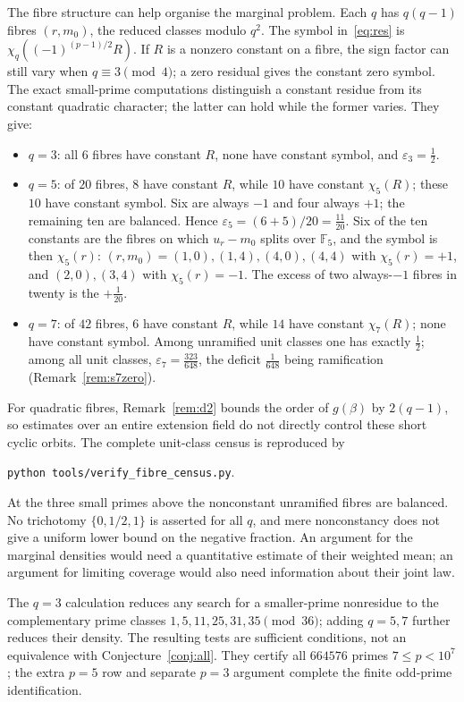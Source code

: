\documentclass[11pt,a4paper]{amsart}
\newcommand{\F}{\mathbb{F}}
\theoremstyle{plain}
\theoremstyle{definition}
\begin{document}
The fibre structure can help organise the marginal problem. Each \(q\) has \(q(q-1)\) fibres \((r,m_0)\), the reduced classes modulo \(q^2\). The symbol in~\eqref{eq:res} is \(\chi_q((-1)^{(p-1)/2}R)\). If \(R\) is a nonzero constant on a fibre, the sign factor can still vary when \(q\equiv3\pmod4\); a zero residual gives the constant zero symbol. The exact small-prime computations distinguish a constant residue from its constant quadratic character; the latter can hold while the former varies. They give:
\begin{itemize}
\item \(q=3\): all \(6\) fibres have constant \(R\), none have constant symbol, and \(\varepsilon_3=\tfrac12\).
\item \(q=5\): of \(20\) fibres, \(8\) have constant \(R\), while \(10\) have constant \(\chi_5(R)\); these \(10\) have constant symbol. Six are always \(-1\) and four always \(+1\); the remaining ten are balanced. Hence \(\varepsilon_5=(6+5)/20=\tfrac{11}{20}\). Six of the ten constants are the fibres on which \(u_r-m_0\) splits over \(\F_5\), and the symbol is then \(\chi_5(r)\): \((r,m_0)=(1,0),(1,4),(4,0),(4,4)\) with \(\chi_5(r)=+1\), and \((2,0),(3,4)\) with \(\chi_5(r)=-1\). The excess of two always-\(-1\) fibres in twenty is the \(+\tfrac1{20}\).
\item \(q=7\): of \(42\) fibres, \(6\) have constant \(R\), while \(14\) have constant \(\chi_7(R)\); none have constant symbol. Among unramified unit classes one has exactly \(\tfrac12\); among all unit classes, \(\varepsilon_7=\tfrac{323}{648}\), the deficit \(\tfrac1{648}\) being ramification (Remark~\ref{rem:s7zero}).
\end{itemize}
For quadratic fibres, Remark~\ref{rem:d2} bounds the order of \(g(\beta)\) by \(2(q-1)\), so estimates over an entire extension field do not directly control these short cyclic orbits. The complete unit-class census is reproduced by
\begin{center}
\texttt{python tools/verify\_fibre\_census.py}.
\end{center}
At the three small primes above the nonconstant unramified fibres are balanced. No trichotomy \(\{0,1/2,1\}\) is asserted for all \(q\), and mere nonconstancy does not give a uniform lower bound on the negative fraction. An argument for the marginal densities would need a quantitative estimate of their weighted mean; an argument for limiting coverage would also need information about their joint law.

The \(q=3\) calculation reduces any search for a smaller-prime nonresidue to the complementary prime classes \(1,5,11,25,31,35\pmod{36}\); adding \(q=5,7\) further reduces their density. The resulting tests are sufficient conditions, not an equivalence with Conjecture~\ref{conj:all}. They certify all \(664576\) primes \(7\le p<10^7\); the extra \(p=5\) row and separate \(p=3\) argument complete the finite odd-prime identification.
\end{document}
